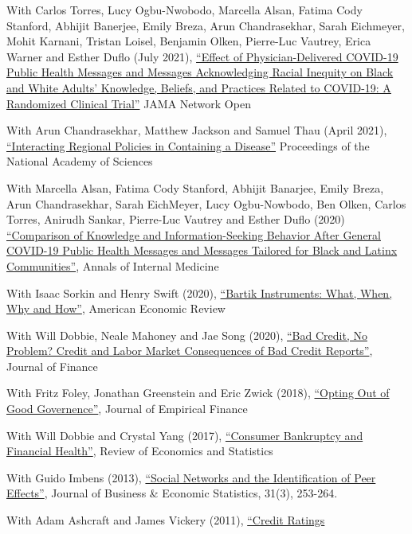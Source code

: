 \documentclass[letterpaper]{article}
\renewenvironment{itemize}{
  \begin{list}{}
    { \setlength{\itemsep}{5pt}
      \setlength{\parsep}{0pt}
      \setlength{\topsep}{0pt}
      \setlength{\leftmargin}{0em} } }{
  \end{list}}
\begin{document}
\begin{itemize}
\item With Carlos Torres, Lucy Ogbu-Nwobodo, Marcella Alsan, Fatima Cody Stanford, Abhijit Banerjee, Emily Breza, Arun Chandrasekhar, Sarah Eichmeyer, Mohit Karnani, Tristan Loisel, Benjamin Olken, Pierre-Luc Vautrey, Erica Warner and Esther Duflo (July 2021), \href{https://jamanetwork.com/journals/jamanetworkopen/fullarticle/2781934}{``Effect of Physician-Delivered COVID-19 Public Health Messages and Messages Acknowledging Racial Inequity on Black and White Adults’ Knowledge, Beliefs, and Practices Related to COVID-19: A Randomized Clinical Trial''} JAMA Network Open
\item With Arun Chandrasekhar, Matthew Jackson and Samuel Thau (April 2021), \href{https://arxiv.org/abs/2008.10745}{``Interacting Regional Policies in Containing a Disease''} Proceedings of the National Academy of Sciences
\item With Marcella Alsan, Fatima Cody Stanford, Abhijit Banarjee, Emily Breza, Arun Chandrasekhar, Sarah EichMeyer, Lucy Ogbu-Nowbodo, Ben Olken, Carlos Torres, Anirudh Sankar, Pierre-Luc Vautrey and Esther Duflo (2020) \href{https://www.acpjournals.org/doi/10.7326/M20-6141}{``Comparison of Knowledge and Information-Seeking Behavior After General COVID-19 Public Health Messages and Messages Tailored for Black and Latinx Communities''}, Annals of Internal Medicine
\item With Isaac Sorkin and Henry Swift (2020), \href{http://paulgp.github.io/papers/bartik_gpss.pdf}{``Bartik Instruments: What, When, Why and How''}, American Economic Review
\item With Will Dobbie, Neale Mahoney and Jae Song (2020), \href{https://papers.ssrn.com/sol3/papers.cfm?abstract_id=2844316}{``Bad Credit, No Problem? Credit and Labor Market Consequences of Bad Credit Reports''}, Journal of Finance
\item With Fritz Foley, Jonathan Greenstein and Eric Zwick (2018), \href{http://www.nber.org/papers/w19953}{``Opting Out of Good Governence''}, Journal of Empirical Finance
\item With Will Dobbie and Crystal Yang (2017), \href{http://www.nber.org/papers/w21032}{``Consumer Bankruptcy and Financial Health''}, Review of Economics and Statistics
\item With Guido Imbens (2013), \href{http://www.tandfonline.com/doi/pdf/10.1080/07350015.2013.801251}{``Social Networks and the Identification of Peer Effects''}, Journal of Business \& Economic Statistics, 31(3), 253-264.
\item With Adam Ashcraft and James Vickery (2011), \href{http://papers.ssrn.com.ezp-prod1.hul.harvard.edu/sol3/papers.cfm?abstract_id=1856823}{``Credit Ratings
}
\end{itemize}
\end{document}
